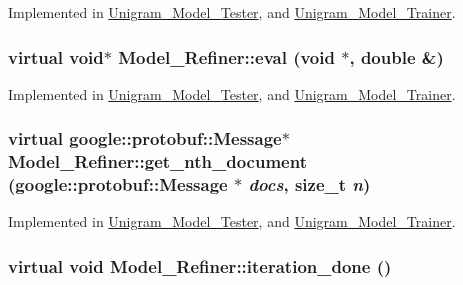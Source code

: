 Implemented in \hyperlink{class_unigram___model___tester_a239d3ab22007a073927dcd80501e6579}{Unigram\_\-Model\_\-Tester}, and \hyperlink{class_unigram___model___trainer_aa5f8c8441588c341c42ec6685bc313d7}{Unigram\_\-Model\_\-Trainer}.

\hypertarget{class_model___refiner_afc5cd8181d1f6fc3ebf0a6bad1d8f023}{
\subsubsection[{eval}]{\setlength{\rightskip}{0pt plus 5cm}virtual void$\ast$ Model\_\-Refiner::eval (void $\ast$, \/  double \&)}}
\label{class_model___refiner_afc5cd8181d1f6fc3ebf0a6bad1d8f023}


Implemented in \hyperlink{class_unigram___model___tester_afb32ae60aac5863d0f8ac50af4fd9ff2}{Unigram\_\-Model\_\-Tester}, and \hyperlink{class_unigram___model___trainer_a354f9cc690b803bc17284b6742702a66}{Unigram\_\-Model\_\-Trainer}.

\hypertarget{class_model___refiner_a6d3bb23a5d76951144004d61b2fdcbe7}{
\subsubsection[{get\_\-nth\_\-document}]{\setlength{\rightskip}{0pt plus 5cm}virtual google::protobuf::Message$\ast$ Model\_\-Refiner::get\_\-nth\_\-document (google::protobuf::Message $\ast$ {\em docs}, \/  size\_\-t {\em n})}}
\label{class_model___refiner_a6d3bb23a5d76951144004d61b2fdcbe7}


Implemented in \hyperlink{class_unigram___model___tester_a0062dadca66fc40748590b4aa721a291}{Unigram\_\-Model\_\-Tester}, and \hyperlink{class_unigram___model___trainer_a032b2dcd9676b5a7ced2dcb57d509c84}{Unigram\_\-Model\_\-Trainer}.

\hypertarget{class_model___refiner_a570c3bd6742f609ba86d724e8f070f1a}{
\subsubsection[{iteration\_\-done}]{\setlength{\rightskip}{0pt plus 5cm}virtual void Model\_\-Refiner::iteration\_\-done ()}}
\label{class_model___refiner_a570c3bd6742f609ba86d724e8f070f1a}


